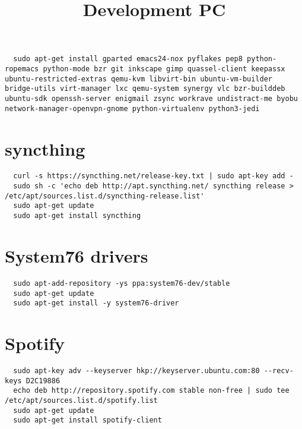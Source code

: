\documentclass[12pt]{article}
\title{Development PC}
\begin{document}
\begin{verbatim}
  sudo apt-get install gparted emacs24-nox pyflakes pep8 python-ropemacs python-mode bzr git inkscape gimp quassel-client keepassx ubuntu-restricted-extras qemu-kvm libvirt-bin ubuntu-vm-builder bridge-utils virt-manager lxc qemu-system synergy vlc bzr-builddeb ubuntu-sdk openssh-server enigmail zsync workrave undistract-me byobu network-manager-openvpn-gnome python-virtualenv python3-jedi
\end{verbatim}

\section{syncthing}

\begin{verbatim}
  curl -s https://syncthing.net/release-key.txt | sudo apt-key add -
  sudo sh -c 'echo deb http://apt.syncthing.net/ syncthing release > /etc/apt/sources.list.d/syncthing-release.list'
  sudo apt-get update
  sudo apt-get install syncthing
\end{verbatim}

\section{System76 drivers}

\begin{verbatim}
  sudo apt-add-repository -ys ppa:system76-dev/stable
  sudo apt-get update
  sudo apt-get install -y system76-driver
\end{verbatim}

\section{Spotify}

\begin{verbatim}
  sudo apt-key adv --keyserver hkp://keyserver.ubuntu.com:80 --recv-keys D2C19886
  echo deb http://repository.spotify.com stable non-free | sudo tee /etc/apt/sources.list.d/spotify.list
  sudo apt-get update
  sudo apt-get install spotify-client
\end{verbatim}
\end{document}
